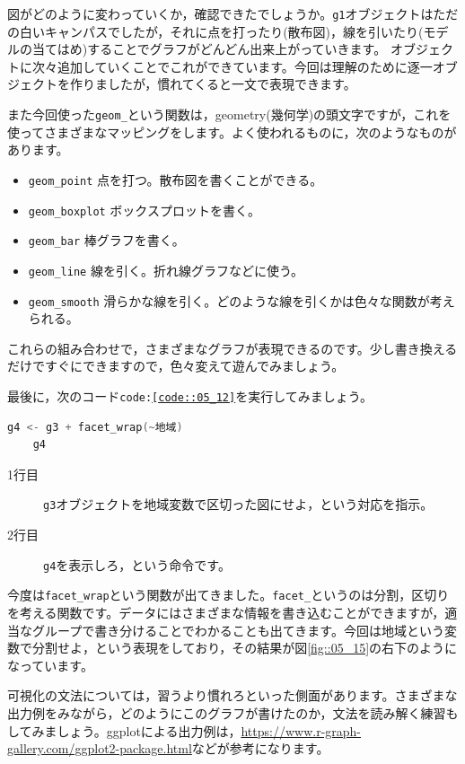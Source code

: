 \documentclass{ltjbook}
\begin{document}
図がどのように変わっていくか，確認できたでしょうか。\texttt{g1}オブジェクトはただの白いキャンパスでしたが，それに点を打ったり(散布図)，線を引いたり(モデルの当てはめ)することでグラフがどんどん出来上がっていきます。
オブジェクトに次々追加していくことでこれができています。今回は理解のために逐一オブジェクトを作りましたが，慣れてくると一文で表現できます。

また今回使った\verb|geom_|という関数は，geometry(幾何学)の頭文字ですが，これを使ってさまざまなマッピングをします。よく使われるものに，次のようなものがあります。
\begin{itemize}
	\item \verb|geom_point| 点を打つ。散布図を書くことができる。
	\item \verb|geom_boxplot| ボックスプロットを書く。
	\item \verb|geom_bar| 棒グラフを書く。
	\item \verb|geom_line| 線を引く。折れ線グラフなどに使う。
	\item \verb|geom_smooth| 滑らかな線を引く。どのような線を引くかは色々な関数が考えられる。
\end{itemize}
これらの組み合わせで，さまざまなグラフが表現できるのです。少し書き換えるだけですぐにできますので，色々変えて遊んでみましょう。

最後に，次のコード\texttt{code:\ref{code::05_12}}を実行してみましょう。
\begin{lstlisting}[language=c++,label={code::05_10},caption={線形モデルを当てはめる}]
	g4 <- g3 + facet_wrap(~地域)
	g4
\end{lstlisting}

\begin{description}
    \item[1行目] \texttt{g3}オブジェクトを地域変数で区切った図にせよ，という対応を指示。
	\item[2行目] \texttt{g4}を表示しろ，という命令です。 
\end{description}

今度は\verb|facet_wrap|という関数が出てきました。\verb|facet_|というのは分割，区切りを考える関数です。データにはさまざまな情報を書き込むことができますが，適当なグループで書き分けることでわかることも出てきます。今回は地域という変数で分割せよ，という表現をしており，その結果が図\ref{fig::05_15}の右下のようになっています。

可視化の文法については，習うより慣れろといった側面があります。さまざまな出力例をみながら，どのようにこのグラフが書けたのか，文法を読み解く練習もしてみましょう。ggplotによる出力例は，\url{https://www.r-graph-gallery.com/ggplot2-package.html}などが参考になります。
\end{document}
